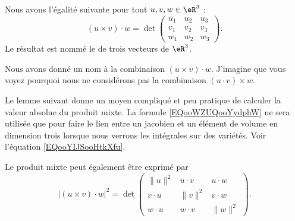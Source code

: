 \begin{lemmaDef}
	Nous avons l'égalité suivante pour tout \( u,v,w\in \eR^3\) :
	\begin{equation}        \label{EQooKJYUooSQgfXU}
		(u\times v)\cdot w=\det\begin{pmatrix}
			u_1 & u_2 & u_3 \\
			v_1 & v_2 & v_3 \\
			w_1 & w_2 & w_3
		\end{pmatrix}.
	\end{equation}
	Le résultat est nommé le  de trois vecteurs de \( \eR^3\).
\end{lemmaDef}

\begin{normaltext}
	Nous avons donné un nom à la combinaison \( (u\times v)\cdot w\). J'imagine que vous voyez pourquoi nous ne considérons pas la combinaison \( (u\cdot v)\times w\).
\end{normaltext}

Le lemme suivant donne un moyen compliqué et peu pratique de calculer la valeur absolue du produit mixte. La formule \eqref{EQooWZUQooYydphW} ne sera utilisée que pour faire le lien entre un jacobien et un élément de volume en dimension trois lorsque nous verrons les intégrales sur des variétés. Voir l'équation \eqref{EQooYIJSooHtkXfu}.

\begin{lemma}        \label{LEMooSMWNooCmEZeY}
	Le produit mixte peut également être exprimé par
	\begin{equation}        \label{EQooWZUQooYydphW}
		|(u\times v)\cdot w|^2=\det\begin{pmatrix}
			\| u \|^2 & u\cdot v  & u\cdot w  \\
			v\cdot u  & \| v \|^2 & v\cdot w  \\
			w\cdot u  & w\cdot v  & \| w \|^2
		\end{pmatrix}.
	\end{equation}
\end{lemma}

